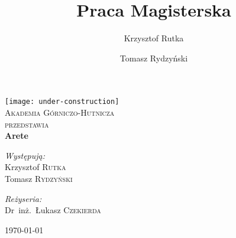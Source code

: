 \documentclass[a4paper,oneside,12pt]{mwbk}
\title{Praca Magisterska}
\author{Krzysztof Rutka \and Tomasz Rydzyński}
\begin{document}
\frontmatter

\begin{titlepage}

\begin{center}

\texttt{[image: under-construction]}\\[1cm]    

\textsc{\LARGE Akademia Górniczo-Hutnicza}\\[1.5cm]

\textsc{\Large przedstawia}\\[0.5cm]


{ \huge \bfseries Arete}\\[0.4cm]


\begin{minipage}{0.4\textwidth}
\begin{flushleft} \large
\emph{Występują:}\\
Krzysztof \textsc{Rutka} \\
Tomasz \textsc{Rydzyński} \\
\end{flushleft}
\end{minipage}
\begin{minipage}{0.4\textwidth}
\begin{flushright} \large
\emph{Reżyseria:} \\
Dr~inż.~Łukasz \textsc{Czekierda}
\end{flushright}
\end{minipage}

\vfill

{\large \today}

\end{center}

\end{titlepage}

\setcounter{tocdepth}{1}



\begin{spacing}{0.9}
\tableofcontents
\end{spacing}

\mainmatter








\appendix



\backmatter

\end{document}
